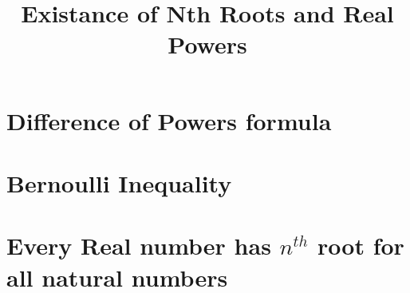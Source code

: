 \documentclass[a4paper, 11pt]{article}
\title{Existance of Nth Roots and Real Powers}
\begin{document}
\section{Difference of Powers formula}
\section{Bernoulli Inequality}
\section{Every Real number has $n^{th}$ root for all natural numbers}
\end{document}
